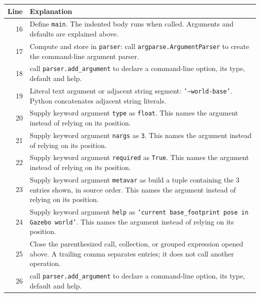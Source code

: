 \documentclass[11pt,a4paper]{book}
\begin{document}
\begin{longtable}{r p{}}

\textbf{Line} & \textbf{Explanation} \\ \hline \endhead

16 & Define \texttt{main}. The indented body runs when called. Arguments and defaults are explained above. \\

17 & Compute and store in \texttt{parser}: call \texttt{argparse.ArgumentParser} to create the command-line argument parser.  \\

18 & call \texttt{parser.add\_argument} to declare a command-line option, its type, default and help. \\

19 & Literal text argument or adjacent string segment: \texttt{'--world-base'}. Python concatenates adjacent string literals. \\

20 & Supply keyword argument \texttt{type} as \texttt{float}. This names the argument instead of relying on its position. \\

21 & Supply keyword argument \texttt{nargs} as \texttt{3}. This names the argument instead of relying on its position. \\

22 & Supply keyword argument \texttt{required} as \texttt{True}. This names the argument instead of relying on its position. \\

23 & Supply keyword argument \texttt{metavar} as build a tuple containing the 3 entries shown, in source order. This names the argument instead of relying on its position. \\

24 & Supply keyword argument \texttt{help} as \texttt{'current base\_footprint pose in Gazebo world'}. This names the argument instead of relying on its position. \\

25 & Close the parenthesized call, collection, or grouped expression opened above. A trailing comma separates entries; it does not call another operation. \\

26 & call \texttt{parser.add\_argument} to declare a command-line option, its type, default and help. \\


\end{longtable}
\end{document}
